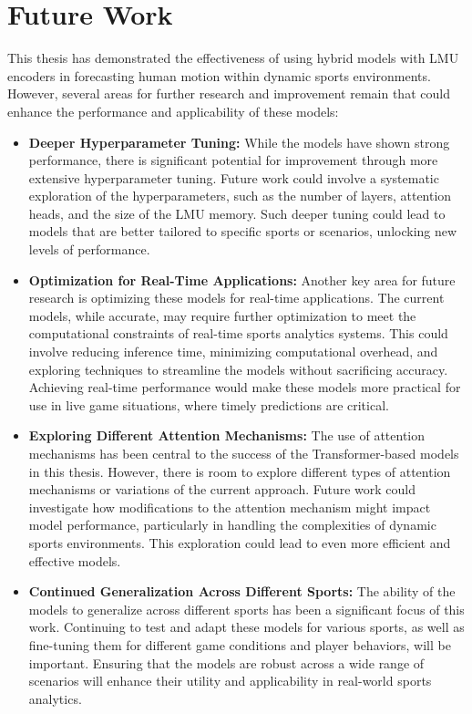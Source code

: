 \chapter{Future Work}
\label{chapt:outlook}
This thesis has demonstrated the effectiveness of using hybrid models with LMU encoders in forecasting human motion within dynamic sports environments. However, several areas for further research and improvement remain that could enhance the performance and applicability of these models:

\begin{itemize}
    \item \textbf{Deeper Hyperparameter Tuning:} While the models have shown strong performance, there is significant potential for improvement through more extensive hyperparameter tuning. Future work could involve a systematic exploration of the hyperparameters, such as the number of layers, attention heads, and the size of the LMU memory. Such deeper tuning could lead to models that are better tailored to specific sports or scenarios, unlocking new levels of performance.

    \item \textbf{Optimization for Real-Time Applications:} Another key area for future research is optimizing these models for real-time applications. The current models, while accurate, may require further optimization to meet the computational constraints of real-time sports analytics systems. This could involve reducing inference time, minimizing computational overhead, and exploring techniques to streamline the models without sacrificing accuracy. Achieving real-time performance would make these models more practical for use in live game situations, where timely predictions are critical.

    \item \textbf{Exploring Different Attention Mechanisms:} The use of attention mechanisms has been central to the success of the Transformer-based models in this thesis. However, there is room to explore different types of attention mechanisms or variations of the current approach. Future work could investigate how modifications to the attention mechanism might impact model performance, particularly in handling the complexities of dynamic sports environments. This exploration could lead to even more efficient and effective models.

    \item \textbf{Continued Generalization Across Different Sports:} The ability of the models to generalize across different sports has been a significant focus of this work. Continuing to test and adapt these models for various sports, as well as fine-tuning them for different game conditions and player behaviors, will be important. Ensuring that the models are robust across a wide range of scenarios will enhance their utility and applicability in real-world sports analytics.


\end{itemize}
